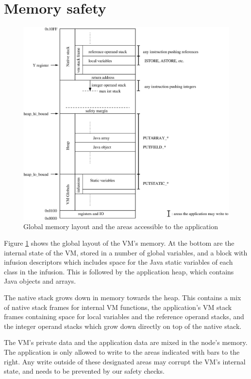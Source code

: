 \section{Memory safety}

\begin{figure}
\includegraphics[width=\linewidth]{memlayout.eps}
\caption{Global memory layout and the areas accessible to the application}
\label{fig-memlayout}
\end{figure}

Figure \ref{fig-memlayout} shows the global layout of the VM's memory. At the bottom are the internal state of the VM, stored in a number of global variables, and a block with infusion descriptors which includes space for the Java static variables of each class in the infusion. This is followed by the application heap, which contains Java objects and arrays.

The native stack grows down in memory towards the heap. This contains a mix of native stack frames for internal VM functions, the application's VM stack frames containing space for local variables and the reference operand stacks, and the integer operand stacks which grow down directly on top of the native stack.

The VM's private data and the application data are mixed in the node's memory. The application is only allowed to write to the areas indicated with bars to the right. Any write outside of these designated areas may corrupt the VM's internal state, and needs to be prevented by our safety checks.

